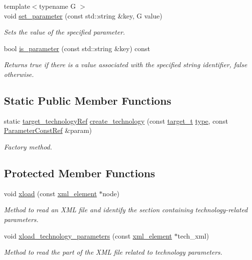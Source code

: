 \begin{DoxyCompactItemize}
{\footnotesize template$<$typename G $>$ }\\void \hyperlink{classtarget__technology_a5ab437ee434569815da739feae3785bc}{set\+\_\+parameter} (const std\+::string \&key, G value)
\begin{DoxyCompactList}\small\item\em Sets the value of the specified parameter. \end{DoxyCompactList}\item 
bool \hyperlink{classtarget__technology_a01f34071b310808b080a0bb8db41ea3f}{is\+\_\+parameter} (const std\+::string \&key) const
\begin{DoxyCompactList}\small\item\em Returns true if there is a value associated with the specified string identifier, false otherwise. \end{DoxyCompactList}\end{DoxyCompactItemize}
\subsection*{Static Public Member Functions}
\begin{DoxyCompactItemize}
\item 
static \hyperlink{target__technology_8hpp_a16af97aadc4eb998c2c9ec7fba5ccecd}{target\+\_\+technology\+Ref} \hyperlink{classtarget__technology_ad1a3a587984c7728ee7999f58a56c21a}{create\+\_\+technology} (const \hyperlink{classtarget__technology_a84257c2d384aa7dce6a060105113459b}{target\+\_\+t} \hyperlink{classtarget__technology_a0591e52e0dc59d81f3dc96f7ef9f7081}{type}, const \hyperlink{Parameter_8hpp_a37841774a6fcb479b597fdf8955eb4ea}{Parameter\+Const\+Ref} \&param)
\begin{DoxyCompactList}\small\item\em Factory method. \end{DoxyCompactList}\end{DoxyCompactItemize}
\subsection*{Protected Member Functions}
\begin{DoxyCompactItemize}
\item 
void \hyperlink{classtarget__technology_aef59dfe918223198c592fa318f56de2b}{xload} (const \hyperlink{classxml__element}{xml\+\_\+element} $\ast$node)
\begin{DoxyCompactList}\small\item\em Method to read an X\+ML file and identify the section containing technology-\/related parameters. \end{DoxyCompactList}\item 
void \hyperlink{classtarget__technology_a272517464925f914dae13b88d269e439}{xload\+\_\+technology\+\_\+parameters} (const \hyperlink{classxml__element}{xml\+\_\+element} $\ast$tech\+\_\+xml)
\begin{DoxyCompactList}\small\item\em Method to read the part of the X\+ML file related to technology parameters. \end{DoxyCompactList}\end{DoxyCompactItemize}
